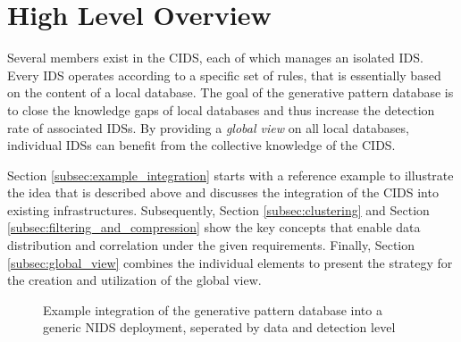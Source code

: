 \documentclass[../../main.tex]{subfiles}
\begin{document}
\section{High Level Overview}\label{sec:high_level_overview}

Several members exist in the CIDS, each of which manages an isolated IDS. Every IDS operates according to a specific set of rules, that is essentially based on the content of a local database. The goal of the generative pattern database is to close the knowledge gaps of local databases and thus increase the detection rate of associated IDSs. By providing a \textit{global view} on all local databases, individual IDSs can benefit from the collective knowledge of the CIDS.

Section \ref{subsec:example_integration} starts with a reference example to illustrate the idea that is described above and discusses the integration of the CIDS into existing infrastructures. Subsequently, Section \ref{subsec:clustering} and Section \ref{subsec:filtering_and_compression} show the key concepts that enable data distribution and correlation under the given requirements. Finally, Section \ref{subsec:global_view} combines the individual elements to present the strategy for the creation and utilization of the global view.






\begin{figure}[t!]
    \centering
    
    \caption{Example integration of the generative pattern database into a generic NIDS deployment, seperated by data and detection level}
    \label{fig:high_level_architecture}
\end{figure}
\end{document}
